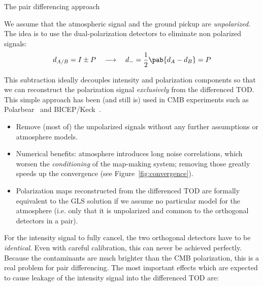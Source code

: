 \documentclass[final]{beamer}
\newlength{\colwidth}
\begin{document}
\begin{frame}[t]
\begin{columns}[t]
\begin{column}{\colwidth}
\begin{alertblock}{The pair differencing approach}

        We assume that the atmospheric signal and the ground pickup are \emph{unpolarized}.
        The idea is to use the dual-polarization detectors
        to eliminate non polarized signals:
        \[
          d_{A/B} = I \pm P
          \quad\longrightarrow\quad
          d_- = \frac12 \pab{d_A - d_B} = P
        \]

        This subtraction ideally decouples intensity and polarization components so that we can reconstruct the polarization signal \emph{exclusively} from the differenced TOD.
        This simple approach has been (and still is) used in CMB experiments such as Polarbear~\cite{Poletti:2016xhi} and BICEP/Keck~\cite{BICEP2:2014dgt}. %


        \begin{itemize}
          \item Remove (most of) the unpolarized signals without any further assumptions or atmosphere models.
          \item Numerical benefits: atmosphere introduces long noise correlations, which worsen the \emph{conditioning} of the map-making system; removing those greatly speeds up the convergence (see Figure~\ref{fig:convergence}).
          \item Polarization maps reconstructed from the differenced TOD are formally equivalent to the GLS solution if we assume no particular model for the atmosphere (i.e. only that it is unpolarized and common to the orthogonal detectors in a pair).
        \end{itemize}


        For the intensity signal to fully cancel, the two orthogonal detectors have to be \emph{identical}.
        Even with careful calibration, this can never be achieved perfectly.
        Because the contaminants are much brighter than the CMB polarization, this is a real problem for pair differencing.
        The most important effects which are expected to cause leakage of the intensity signal into the differenced TOD are:


\end{alertblock}
\end{column}
\end{columns}
\end{frame}
\end{document}

